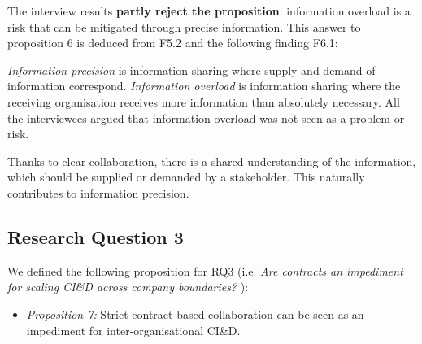 The interview results {\bf %
{partly reject} the proposition}: information overload {is a risk} %
{ that can be mitigated through precise information}. This answer to proposition 6 is deduced from {F5.2} and the following finding {F6.1}:

{\em Information precision} is information sharing where supply and demand of information correspond. {\em Information overload} is information sharing where the receiving organisation receives more information than absolutely necessary. 
All the interviewees argued that information overload was not seen as a problem or risk.

Thanks to clear collaboration, there is a shared understanding of the information, which should be supplied or demanded by a stakeholder. This naturally contributes to information precision.

\subsection{Research Question 3}\label{sec:ResearchQuestion3}

We defined the following proposition for  
RQ3 (i.e. {\em Are contracts an impediment for scaling %
{CI\&D} across company boundaries?%
}):

\begin{itemize}
\item \emph{Proposition 7: }{Strict contract-based collaboration can be seen as an impediment for inter-organisational CI\&D.}%
\end{itemize}


